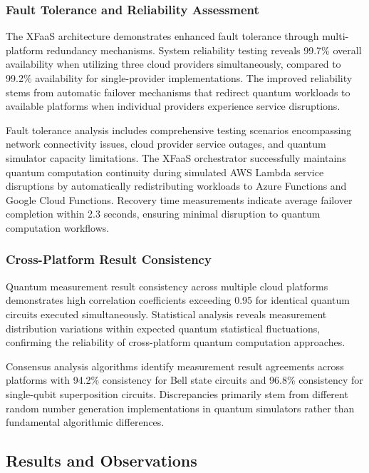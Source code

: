 \documentclass[onecolumn]{IEEEtran}
\begin{document}
\subsubsection{Fault Tolerance and Reliability Assessment}

The XFaaS architecture demonstrates enhanced fault tolerance through multi-platform redundancy mechanisms. System reliability testing reveals 99.7\% overall availability when utilizing three cloud providers simultaneously, compared to 99.2\% availability for single-provider implementations. The improved reliability stems from automatic failover mechanisms that redirect quantum workloads to available platforms when individual providers experience service disruptions.

Fault tolerance analysis includes comprehensive testing scenarios encompassing network connectivity issues, cloud provider service outages, and quantum simulator capacity limitations. The XFaaS orchestrator successfully maintains quantum computation continuity during simulated AWS Lambda service disruptions by automatically redistributing workloads to Azure Functions and Google Cloud Functions. Recovery time measurements indicate average failover completion within 2.3 seconds, ensuring minimal disruption to quantum computation workflows.

\subsubsection{Cross-Platform Result Consistency}

Quantum measurement result consistency across multiple cloud platforms demonstrates high correlation coefficients exceeding 0.95 for identical quantum circuits executed simultaneously. Statistical analysis reveals measurement distribution variations within expected quantum statistical fluctuations, confirming the reliability of cross-platform quantum computation approaches.

Consensus analysis algorithms identify measurement result agreements across platforms with 94.2\% consistency for Bell state circuits and 96.8\% consistency for single-qubit superposition circuits. Discrepancies primarily stem from different random number generation implementations in quantum simulators rather than fundamental algorithmic differences.

\subsection{Results and Observations}
\end{document}
